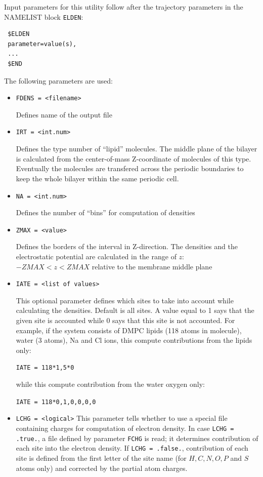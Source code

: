 \documentclass{article}
\begin{document}
Input parameters for this utility follow after the trajectory parameters
in the NAMELIST block \verb|ELDEN|:

\begin{verbatim}
 $ELDEN
 parameter=value(s),
 ...
 $END
\end{verbatim}

The following parameters are used:

\begin{itemize}

\item
\verb|FDENS = <filename>|

Defines name of the output file

\item
\verb|IRT = <int.num>|

Defines the type number of ``lipid'' molecules. The middle plane of the bilayer
is calculated from the center-of-mass Z-coordinate of molecules of 
this type. Eventually the molecules are transfered across the periodic 
boundaries to keep the whole bilayer within the same periodic cell.

\item
\verb|NA = <int.num>|

Defines the number of ``bins'' for computation of densities

\item
\verb|ZMAX = <value>|

Defines the borders of the interval in Z-direction. The densities and
the electrostatic potential are calculated in the range of $z$:
$-ZMAX < z < ZMAX$ relative to the membrane middle plane

\item
\verb|IATE = <list of values>|

This optional parameter defines which sites to take into account while
calculating the densities. Default is all sites. 
A value equal to 1 says that the given site is accounted while 0 says
that this site is not accounted. For example, if the 
system consists of DMPC lipids (118 atoms in molecule), water (3 atoms),
Na and Cl ions, this compute contributions from the lipids only:

\verb|IATE = 118*1,5*0|

while this compute contribution from the water oxygen only:
  
\verb|IATE = 118*0,1,0,0,0,0|

\item
\verb|LCHG = <logical>|
This parameter tells whether to use a special file containing charges
for computation of electron density. In case \verb|LCHG = .true.|,
a file defined by parameter \verb|FCHG| is read; it determines contribution
of each site into the electron density. If \verb|LCHG = .false.|,
contribution of each site is defined from the first letter of the site name
(for $H,C,N,O,P$ and $S$ atoms only) and corrected by the partial atom charges.


\end{itemize}
\end{document}
